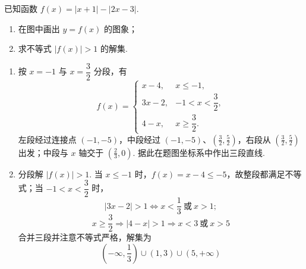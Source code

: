 \begin{problem}

已知函数 \(f(x)=|x+1|-|2x-3|\).

\begin{enumerate}
\item 在图中画出 \(y=f(x)\) 的图象；
\item 求不等式 \(|f(x)|>1\) 的解集.
\end{enumerate}

\FloatBarrier
\end{problem}

\begin{solution}
\begin{enumerate}
\item 按 \(x=-1\) 与 \(x=\dfrac32\) 分段，有
\[
f(x)=\begin{cases}
x-4,&x\leqslant-1,\\
3x-2,&-1<x<\dfrac{3}{2},\\
4-x,&x\geqslant\dfrac{3}{2}.
\end{cases}
\]
左段经过连接点 \((-1,-5)\)，中段经过 \((-1,-5)\)、\((\frac32,\frac52)\)，右段从 \((\frac32,\frac52)\) 出发；中段与 \(x\) 轴交于 \((\frac23,0)\). 据此在题图坐标系中作出三段直线.
\item 分段解 \(|f(x)|>1\). 当 \(x\leqslant-1\) 时，\(f(x)=x-4\leqslant-5\)，故整段都满足不等式；当 \(-1<x<\dfrac32\) 时，
\[
|3x-2|>1
\Longleftrightarrow x<\frac13\ \text{或}\ x>1;
\]
\[
x\geqslant\frac32\Rightarrow |4-x|>1
\Rightarrow x<3\ \text{或}\ x>5
\]
合并三段并注意不等式严格，解集为
\[
\left(-\infty,\frac13\right)\cup(1,3)\cup(5,+\infty)
\]
\end{enumerate}
\end{solution}
